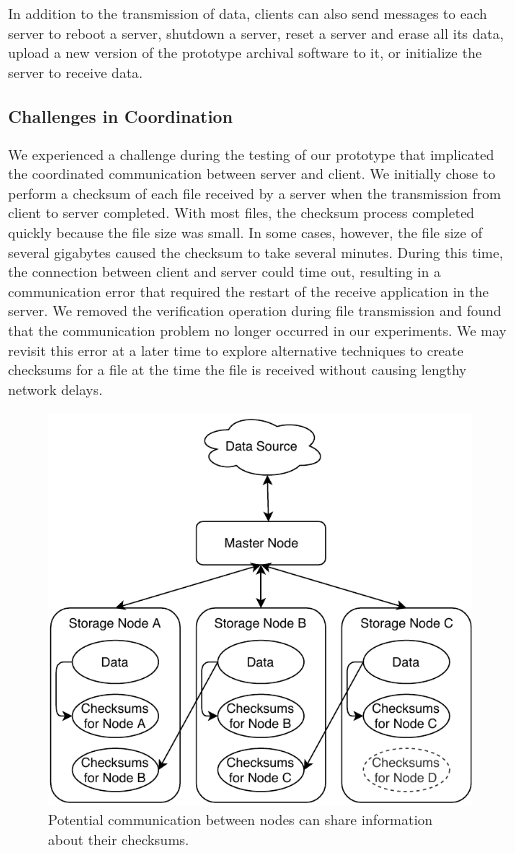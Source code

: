 In addition to the transmission of data, clients can also send messages to each server to reboot a server, shutdown a server, reset a server and erase all its data, upload a new version of the prototype archival software to it, or initialize the server to receive data.

\subsubsection{Challenges in Coordination}
We experienced a challenge during the testing of our prototype that implicated the coordinated communication between server and client.  We initially chose to perform a checksum of each file received by a server when the transmission from client to server completed.  With most files, the checksum process completed quickly because the file size was small.  In some cases, however, the file size of several gigabytes caused the checksum to take several minutes.  During this time, the connection between client and server could time out, resulting in a communication error that required the restart of the receive application in the server.  We removed the verification operation during file transmission and found that the communication problem no longer occurred in our experiments.  We may revisit this error at a later time to explore alternative techniques to create checksums for a file at the time the file is received without causing lengthy network delays.

\begin{figure}[!ht]
\includegraphics[width=\linewidth]{fig4.pdf}
\caption{Potential communication between nodes can share information about their checksums.}
\label{fig4}
\end{figure}

